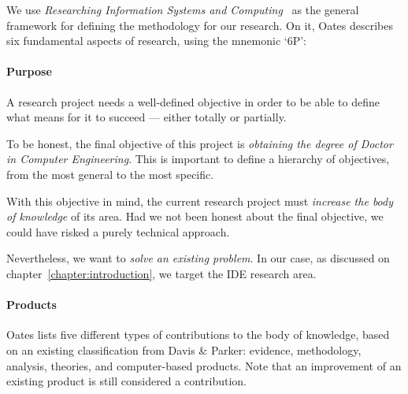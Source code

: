 We use \emph{Researching Information Systems and Computing}~\cite{Oates2006} as the
general framework for defining the methodology for our research. On it, Oates describes
six fundamental aspects of research, using the mnemonic `6P':


\paragraph{Purpose}
\label{method:purpose}
A research project needs a well-defined objective in order to be able
to define what means for it to succeed --- either totally or partially.

To be honest, the final objective of this project is \emph{obtaining the
degree of Doctor in Computer Engineering}. This is important to define
a hierarchy of objectives, from the most general to the most specific. 

With this objective in mind, the current research project must
\emph{increase the body of knowledge} of its area. Had we not been honest
about the final objective, we could have risked a purely technical approach.

Nevertheless, we want to \emph{solve an existing problem}. In our case,
as discussed on chapter~\ref{chapter:introduction}, we target the
\gls{IDE} research area.

\paragraph{Products}
\label{method:products}
Oates lists five different types of contributions to the body of knowledge, based on
an existing classification from Davis \& Parker\cite{Oates2006,Davis1997}:
evidence, methodology, analysis, theories, and computer-based products. Note
that an improvement of an existing product is still considered a contribution.

